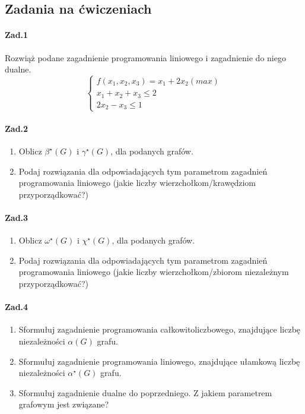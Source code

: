 \documentclass[a4paper,12pt]{article}
\theoremstyle{definition}%
\theoremstyle{definition}
\theoremstyle{problem}
\begin{document}
\subsection{Zadania na ćwiczeniach}
\paragraph{Zad.1} Rozwiąż podane zagadnienie programowania liniowego i zagadnienie do niego dualne.
$$\left\{\begin{matrix}
f(x_1, x_2, x_3) = x_1 + 2x_2 (max)\\
x_1 + x_2 + x_3 \leq 2\\
2x_2 - x_3 \leq 1
\end{matrix}\right.$$

\paragraph{Zad.2}
\begin{enumerate}[label=\alph*)]
\item Oblicz $\beta ^\star (G)$  i $\gamma ^\star (G)$, dla podanych grafów.
\item Podaj rozwiązania dla odpowiadających tym parametrom zagadnień programowania liniowego (jakie liczby wierzchołkom/krawędziom przyporządkować?)
\end{enumerate}


\paragraph{Zad.3}
\begin{enumerate}[label=\alph*]
\item Oblicz $\omega ^\star (G)$ i $\chi ^\star (G)$, dla podanych grafów.
\item Podaj rozwiązania dla odpowiadających tym parametrom zagadnień programowania liniowego (jakie liczby wierzchołkom/zbiorom niezależnym przyporządkować?)
\end{enumerate}

\paragraph{Zad.4}
\begin{enumerate}
\item Sformułuj zagadnienie programowania całkowitoliczbowego, znajdujące liczbę niezależności $\alpha (G)$ grafu.
\item Sformułuj zagadnienie programowania liniowego, znajdujące ułamkową liczbę niezależności $\alpha ^\star(G)$ grafu.
\item Sformułuj zagadnienie dualne do poprzedniego. Z jakiem parametrem grafowym jest związane?
\end{enumerate}



\end{document}
